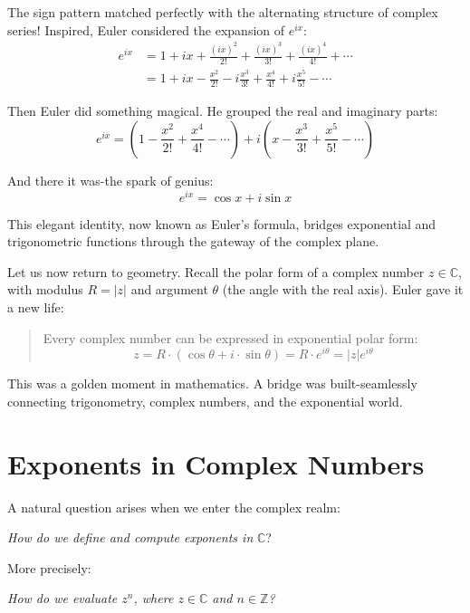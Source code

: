 The sign pattern matched perfectly with the alternating structure of complex series! Inspired, Euler considered the expansion of $e^{ix}$:
\begin{align*}
e^{ix} &= 1 + ix + \frac{(ix)^2}{2!} + \frac{(ix)^3}{3!} + \frac{(ix)^4}{4!} + \dotsb \\
&= 1 + ix - \frac{x^2}{2!} - i\frac{x^3}{3!} + \frac{x^4}{4!} + i\frac{x^5}{5!} - \dotsb \tag{1.5}
\end{align*}

Then Euler did something magical. He grouped the real and imaginary parts:
\[
e^{ix} = \left(1 - \frac{x^2}{2!} + \frac{x^4}{4!} - \dotsb\right) + i\left(x - \frac{x^3}{3!} + \frac{x^5}{5!} - \dotsb\right)
\]

And there it was-the spark of genius:
\[
e^{ix} = \cos x + i \sin x \tag{1.6}
\]

This elegant identity, now known as Euler’s formula, bridges exponential and trigonometric functions through the gateway of the complex plane.

\vspace{1em}
Let us now return to geometry. Recall the polar form of a complex number $z \in \mathbb{C}$, with modulus $R = |z|$ and argument $\theta$ (the angle with the real axis). Euler gave it a new life:

\begin{quote}
Every complex number can be expressed in exponential polar form:
\[
z = R \cdot (\cos \theta + i \cdot \sin \theta) = R \cdot e^{i\theta} = |z| e^{i\theta}
\]
\end{quote}

This was a golden moment in mathematics. A bridge was built-seamlessly connecting trigonometry, complex numbers, and the exponential world.

\section*{Exponents in Complex Numbers}

A natural question arises when we enter the complex realm:

\begin{center}
    \emph{How do we define and compute exponents in} $\mathbb{C}$?
\end{center}

More precisely:  
\begin{center}
    \emph{How do we evaluate $z^n$, where $z \in \mathbb{C}$ and $n \in \mathbb{Z}$?}
\end{center}

